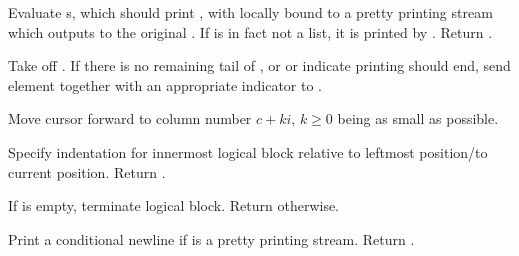 \begin{LIST}{1cm}
  {
    Evaluate s, which should print , with
     locally bound to a pretty 
    printing stream which outputs to the original . If
     is in fact not a list, it is printed by
    . Return \retval{\NIL}.
  }

  \begin{LIST}{.5cm}

    {
      Take  off . If there is no remaining
      tail of , or  or  indicate
      printing should end, send element together with an appropriate
      indicator to . 
    }

    {
      Move cursor forward to column number $c + ki$, $k \geq 0$ being as small
      as possible.
    }
    
    {
      Specify indentation for innermost logical block relative to
      leftmost position/to current position. Return \retval{\NIL}.
    }
    
    {
      If  is empty, terminate logical block. Return
      \retval{\NIL} otherwise.
    }
    
  \end{LIST}

  {
    Print a conditional newline if  is a pretty printing
    stream. Return \retval{\NIL}. 
  }


\end{LIST}
